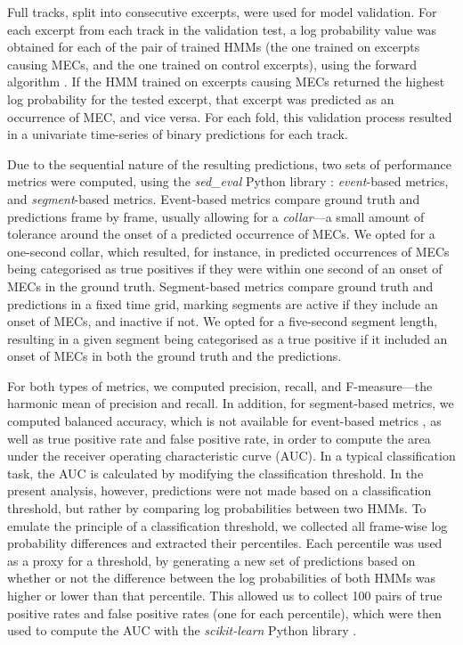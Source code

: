 Full tracks, split into consecutive excerpts, were used for model validation. For each excerpt from each track in the validation test, a log probability value was obtained for each of the pair of trained HMMs (the one trained on excerpts causing MECs, and the one trained on control excerpts), using the forward algorithm \parencite[see][]{jurafsky2021}. If the HMM trained on excerpts causing MECs returned the highest log probability for the tested excerpt, that excerpt was predicted as an occurrence of MEC, and vice versa. For each fold, this validation process resulted in a univariate time-series of binary predictions for each track.

Due to the sequential nature of the resulting predictions, two sets of performance metrics were computed, using the \emph{sed\_eval} Python library \parencite{mesaros2016}: \emph{event}-based metrics, and \emph{segment}-based metrics. Event-based metrics compare ground truth and predictions frame by frame, usually allowing for a \emph{collar}---a small amount of tolerance around the onset of a predicted occurrence of MECs. We opted for a one-second collar, which resulted, for instance, in predicted occurrences of MECs being categorised as true positives if they were within one second of an onset of MECs in the ground truth. Segment-based metrics compare ground truth and predictions in a fixed time grid, marking segments are active if they include an onset of MECs, and inactive if not. We opted for a five-second segment length, resulting in a given segment being categorised as a true positive if it included an onset of MECs in both the ground truth and the predictions.

For both types of metrics, we computed precision, recall, and F-measure---the harmonic mean of precision and recall. In addition, for segment-based metrics, we computed balanced accuracy, which is not available for event-based metrics \parencite[see][]{mesaros2016}, as well as true positive rate and false positive rate, in order to compute the area under the receiver operating characteristic curve (AUC). In a typical classification task, the AUC is calculated by modifying the classification threshold. In the present analysis, however, predictions were not made based on a classification threshold, but rather by comparing log probabilities between two HMMs. To emulate the principle of a classification threshold, we collected all frame-wise log probability differences and extracted their percentiles. Each percentile was used as a proxy for a threshold, by generating a new set of predictions based on whether or not the difference between the log probabilities of both HMMs was higher or lower than that percentile. This allowed us to collect 100 pairs of true positive rates and false positive rates (one for each percentile), which were then used to compute the AUC with the \emph{scikit-learn} Python library \parencite{pedregosa2011}.

